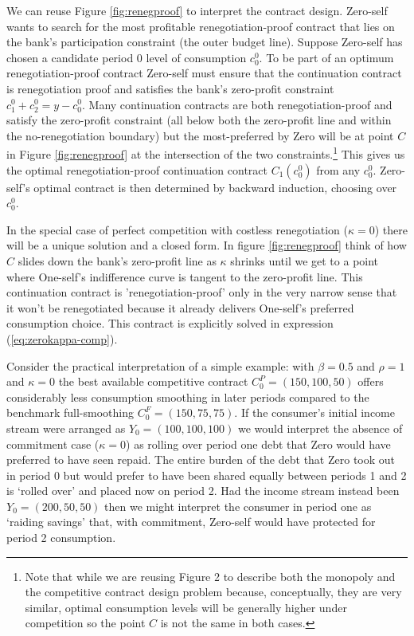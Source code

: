 \documentclass[11pt,english]{article}
\theoremstyle{plain}
\theoremstyle{definition}
\begin{document}
We can reuse Figure \ref{fig:renegproof} to interpret the contract
design. Zero-self wants to search for the most profitable renegotiation-proof
contract that lies on the bank's participation constraint (the outer
budget line). Suppose Zero-self has chosen a candidate period 0 level
of consumption $c_{0}^{0}$. To be part of an optimum renegotiation-proof
contract Zero-self must ensure that the continuation contract is renegotiation
proof and satisfies the bank's zero-profit constraint $c_{1}^{0}+c_{2}^{0}=y-c_{0}^{0}$.
Many continuation contracts are both renegotiation-proof and satisfy
the zero-profit constraint (all below both the zero-profit line and
within the no-renegotiation boundary) but the most-preferred by Zero
will be at point $C$ in Figure \ref{fig:renegproof} at the intersection
of the two constraints.\footnote{Note that while we are reusing Figure 2 to describe both the monopoly
and the competitive contract design problem because, conceptually,
they are very similar, optimal consumption levels will be generally
higher under competition so the point $C$ is not the same in both
cases.} This gives us the optimal renegotiation-proof continuation contract
$C_{1}^ {}(c_{0}^{0})$ from any $c_{0}^{0}$. Zero-self's optimal
contract is then determined by backward induction, choosing over $c_{0}^{0}$.

In the special case of perfect competition with costless renegotiation
($\kappa=0$) there will be a unique solution and a closed form. In
figure \ref{fig:renegproof} think of how $C$ slides down the bank's
zero-profit line as $\kappa$ shrinks until we get to a point where
One-self's indifference curve is tangent to the zero-profit line.
This continuation contract is 'renegotiation-proof' only in the very
narrow sense that it won't be renegotiated because it already delivers
One-self's preferred consumption choice. This contract is explicitly
solved in expression (\ref{eq:zerokappa-comp}).

Consider the practical interpretation of a simple example: with $\beta=0.5$
and $\rho=1$ and $\kappa=0$ the best available competitive contract
$C_{0}^{P}=(150,100,50)$ offers considerably less consumption smoothing
in later periods compared to the benchmark full-smoothing $C_{0}^{F}=(150,75,75)$.
If the consumer's initial income stream were arranged as $Y_{0}=(100,100,100)$
we would interpret the absence of commitment case ($\kappa=0$) as
rolling over period one debt that Zero would have preferred to have
seen repaid. The entire burden of the debt that Zero took out in period
0 but would prefer to have been shared equally between periods 1 and
2 is `rolled over' and placed now on period 2. Had the income stream
instead been $Y_{0}=(200,50,50)$ then we might interpret the consumer
in period one as `raiding savings' that, with commitment, Zero-self
would have protected for period 2 consumption.
\end{document}
